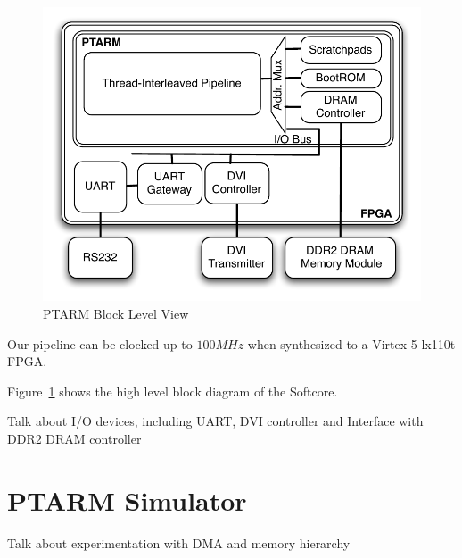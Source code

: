 \begin{figure}
  \vspace{-20pt}
  \begin{center}
    \includegraphics[scale=.6]{figs/ptarm_vhdl_high_level}
  \end{center}
  \vspace{-20pt}
  \caption{PTARM Block Level View}
  \label{fig:ptarm_vhdl_high_level}
  \vspace{-10pt}
\end{figure}   

Our pipeline can be clocked up to $100MHz$ when synthesized to a Virtex-5 lx110t FPGA.

Figure~\ref{fig:ptarm_vhdl_high_level} shows the high level block diagram of the Softcore.
 
Talk about I/O devices, including UART, DVI controller and Interface with DDR2 DRAM controller

\section{PTARM Simulator}
\label{sec:ptarm_sim}


Talk about experimentation with DMA and memory hierarchy

